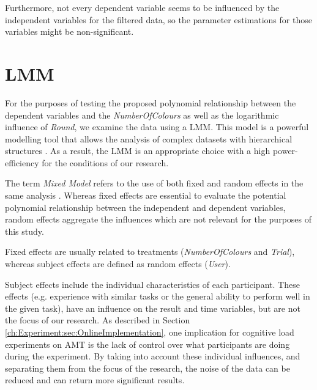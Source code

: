 Furthermore, not every dependent variable seems to be influenced by the independent variables for the filtered data, so the parameter estimations for those variables might be non-significant.
\newpage
\section{\acf{LMM}}
\label{ch:Evaluation:sec:LMM}

For the purposes of testing the proposed polynomial relationship between the dependent variables and the \textit{NumberOfColours} as well as the logarithmic influence of \textit{Round}, we examine the data using a \acl{LMM}. This model is a powerful modelling tool that allows the analysis of complex datasets with hierarchical structures \citep{Galecki2013}. As a result, the \acl{LMM} is an appropriate choice with a high power-efficiency for the conditions of our research.

The term \textit{Mixed Model} refers to the use of both fixed and random effects in the same analysis \citep{Seltman2012}. Whereas fixed effects are essential to evaluate the potential polynomial relationship between the independent and dependent variables, random effects aggregate the influences which are not relevant for the purposes of this study.
 
Fixed effects are usually related to treatments (\textit{NumberOfColours} and \textit{Trial}), whereas subject effects are defined as random effects (\textit{User}).

Subject effects include the individual characteristics of each participant. These effects (e.g. experience with similar tasks or the general ability to perform well in the given task), have an influence on the result and time variables, but are not the focus of our research. As described in Section \ref{ch:Experiment:sec:OnlineImplementation}, one implication for cognitive load experiments on \acf{AMT} is the lack of control over what participants are doing during the experiment. By taking into account these individual influences, and separating them from the focus of the research, the noise of the data can be reduced and can return more significant results.

